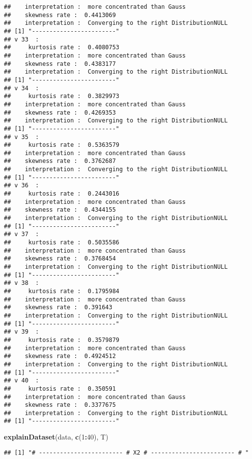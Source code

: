 \documentclass[]{article}
\newenvironment{Shaded}{\begin{snugshade}}{\end{snugshade}}
\newcommand{\DecValTok}[1]{\textcolor[rgb]{0.00,0.00,0.81}{#1}}
\newcommand{\KeywordTok}[1]{\textcolor[rgb]{0.13,0.29,0.53}{\textbf{#1}}}
\newcommand{\NormalTok}[1]{#1}
\newcommand{\OperatorTok}[1]{\textcolor[rgb]{0.81,0.36,0.00}{\textbf{#1}}}
\begin{document}
\begin{verbatim}
##    interpretation :  more concentrated than Gauss 
##    skewness rate :  0.4413069 
##    interpretation :  Converging to the right DistributionNULL
## [1] "------------------------"
## v 33  : 
##     kurtosis rate :  0.4080753 
##    interpretation :  more concentrated than Gauss 
##    skewness rate :  0.4383177 
##    interpretation :  Converging to the right DistributionNULL
## [1] "------------------------"
## v 34  : 
##     kurtosis rate :  0.3829973 
##    interpretation :  more concentrated than Gauss 
##    skewness rate :  0.4269353 
##    interpretation :  Converging to the right DistributionNULL
## [1] "------------------------"
## v 35  : 
##     kurtosis rate :  0.5363579 
##    interpretation :  more concentrated than Gauss 
##    skewness rate :  0.3762687 
##    interpretation :  Converging to the right DistributionNULL
## [1] "------------------------"
## v 36  : 
##     kurtosis rate :  0.2443016 
##    interpretation :  more concentrated than Gauss 
##    skewness rate :  0.4344155 
##    interpretation :  Converging to the right DistributionNULL
## [1] "------------------------"
## v 37  : 
##     kurtosis rate :  0.5035586 
##    interpretation :  more concentrated than Gauss 
##    skewness rate :  0.3768454 
##    interpretation :  Converging to the right DistributionNULL
## [1] "------------------------"
## v 38  : 
##     kurtosis rate :  0.1795984 
##    interpretation :  more concentrated than Gauss 
##    skewness rate :  0.391643 
##    interpretation :  Converging to the right DistributionNULL
## [1] "------------------------"
## v 39  : 
##     kurtosis rate :  0.3579879 
##    interpretation :  more concentrated than Gauss 
##    skewness rate :  0.4924512 
##    interpretation :  Converging to the right DistributionNULL
## [1] "------------------------"
## v 40  : 
##     kurtosis rate :  0.350591 
##    interpretation :  more concentrated than Gauss 
##    skewness rate :  0.3377675 
##    interpretation :  Converging to the right DistributionNULL
## [1] "------------------------"
\end{verbatim}

\begin{Shaded}
\begin{Highlighting}[]
\KeywordTok{explainDataset}\NormalTok{(data, }\KeywordTok{c}\NormalTok{(}\DecValTok{1}\OperatorTok{:}\DecValTok{40}\NormalTok{), T)}
\end{Highlighting}
\end{Shaded}

\begin{verbatim}
## [1] "# ------------------------ # X2 # ------------------------ # "
\end{verbatim}
\end{document}
